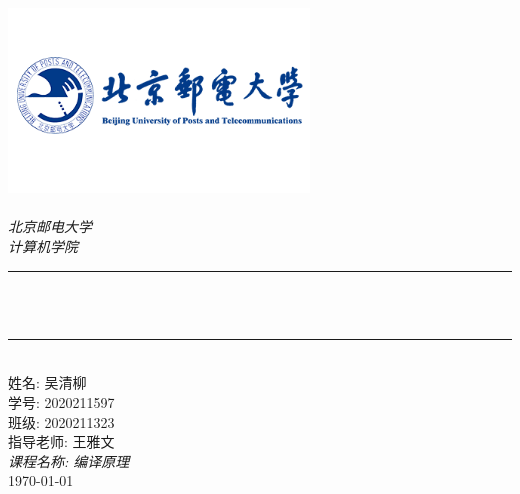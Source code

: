\begin{titlepage}
    \newcommand{\HRule}{\rule{\linewidth}{0.5mm}}
    \includegraphics[width=8cm]{title/logo_bupt.png}\\[1cm]
    \center
    \quad\\[1.5cm]
    \textsl{\Large 北京邮电大学}\\[0.5cm]
    \textsl{\large  计算机学院}\\[0.5cm]
    \makeatletter
    \HRule \\[0.4cm]
    {\huge \bfseries \@title}\\[0.4cm]
    \HRule \\[1.5cm]
    \makeatother
    {\large 姓名: 吴清柳}\\[0.5cm]
    {\large 学号: 2020211597}\\[0.5cm]
    {\large 班级: 2020211323}\\[0.5cm]
    {\large 指导老师: 王雅文}\\[0.5cm]
    {\large \emph{课程名称: 编译原理}}\\[0.5cm]
    {\large \today}\\[2cm]
    \vfill
\end{titlepage}